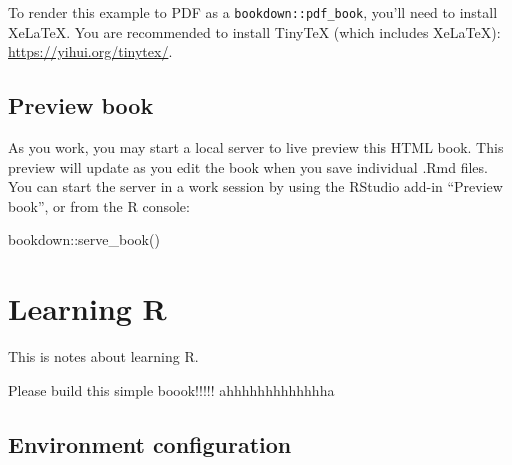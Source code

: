 \documentclass[
]{book}
\newenvironment{Shaded}{\begin{snugshade}}{\end{snugshade}}
\newcommand{\FunctionTok}[1]{\textcolor[rgb]{0.00,0.00,0.00}{#1}}
\newcommand{\NormalTok}[1]{#1}
\newcommand{\SpecialCharTok}[1]{\textcolor[rgb]{0.00,0.00,0.00}{#1}}
\begin{document}
To render this example to PDF as a \texttt{bookdown::pdf\_book}, you'll need to install XeLaTeX. You are recommended to install TinyTeX (which includes XeLaTeX): \url{https://yihui.org/tinytex/}.

\hypertarget{preview-book}{%
\section{Preview book}\label{preview-book}}

As you work, you may start a local server to live preview this HTML book. This preview will update as you edit the book when you save individual .Rmd files. You can start the server in a work session by using the RStudio add-in ``Preview book'', or from the R console:

\begin{Shaded}
\begin{Highlighting}[]
\NormalTok{bookdown}\SpecialCharTok{::}\FunctionTok{serve\_book}\NormalTok{()}
\end{Highlighting}
\end{Shaded}

\hypertarget{learning-r}{%
\chapter{Learning R}\label{learning-r}}

This is notes about learning R.

Please build this simple boook!!!!! ahhhhhhhhhhhhha

\hypertarget{environment-configuration}{%
\section{Environment configuration}\label{environment-configuration}}
\end{document}
